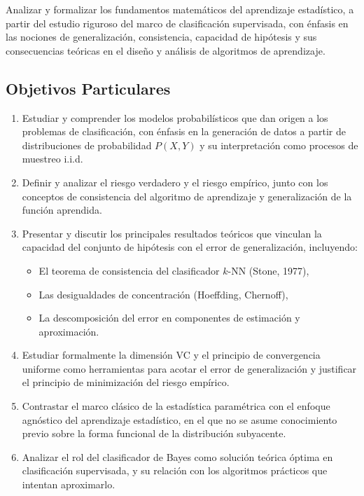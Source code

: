 \documentclass[12pt]{article}
\begin{document}
Analizar y formalizar los fundamentos matemáticos del aprendizaje estadístico, a partir del estudio riguroso del marco de clasificación supervisada, con énfasis en las nociones de generalización, consistencia, capacidad de hipótesis y sus consecuencias teóricas en el diseño y análisis de algoritmos de aprendizaje.

\subsection{Objetivos Particulares}

\begin{enumerate}
    \item Estudiar y comprender los modelos probabilísticos que dan origen a los problemas de clasificación, con énfasis en la generación de datos a partir de distribuciones de probabilidad \( P(X, Y) \) y su interpretación como procesos de muestreo i.i.d.
    
    \item Definir y analizar el riesgo verdadero y el riesgo empírico, junto con los conceptos de consistencia del algoritmo de aprendizaje y generalización de la función aprendida.
    
    \item Presentar y discutir los principales resultados teóricos que vinculan la capacidad del conjunto de hipótesis con el error de generalización, incluyendo:
    \begin{itemize}
        \item El teorema de consistencia del clasificador \( k \)-NN (Stone, 1977),
        \item Las desigualdades de concentración (Hoeffding, Chernoff),
        \item La descomposición del error en componentes de estimación y aproximación.
    \end{itemize}
    
    \item Estudiar formalmente la dimensión VC y el principio de convergencia uniforme como herramientas para acotar el error de generalización y justificar el principio de minimización del riesgo empírico.
    
    \item Contrastar el marco clásico de la estadística paramétrica con el enfoque agnóstico del aprendizaje estadístico, en el que no se asume conocimiento previo sobre la forma funcional de la distribución subyacente.
    
    \item Analizar el rol del clasificador de Bayes como solución teórica óptima en clasificación supervisada, y su relación con los algoritmos prácticos que intentan aproximarlo.
\end{enumerate}
\end{document}
